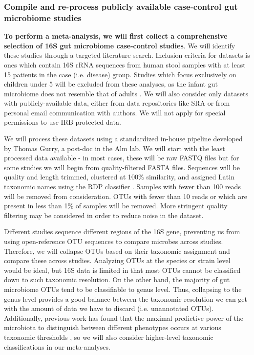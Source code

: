 \documentclass[12pt]{article}
\begin{document}
\subsubsection{Compile and re-process publicly available case-control gut microbiome studies}
\textbf{To perform a meta-analysis, we will first collect a 
comprehensive selection of 16S gut microbiome case-control studies}. We 
will identify these studies through a targeted literature search.  
Inclusion criteria for datasets is ones which contain 
16S rRNA sequences from human stool samples with at least 15 patients in the
case (i.e. disease) group. Studies which focus exclusively on 
children under 5 will be excluded from these analyses, as the infant
gut microbiome does not resemble that of adults \cite{lozupone-meta-2013}.
We will also consider only datasets with 
publicly-available data, either from data repositories like SRA or
from personal email communication with authors. We will not 
apply for special permissions to use IRB-protected data. 

We will process these datasets using a standardized in-house pipeline 
developed by Thomas Gurry, a post-doc in the Alm lab. We will 
start with the least processed data available - in most cases, these will be 
raw FASTQ files but for some studies we will begin from quality-filtered 
FASTA files. Sequences will be quality and length trimmed, clustered 
at 100\% similarity, and assigned Latin taxonomic names using the RDP 
classifier \cite{wang-rdp-2007}. Samples with fewer than 100 reads will be removed from 
consideration. OTUs with fewer than 10 reads or which are present in 
less than 1\% of samples will be removed. More stringent quality 
filtering may be considered in order to reduce noise in the dataset.

Different studies sequence different regions of the 16S gene,
preventing us from using open-reference OTU sequences to compare
microbes across studies. Therefore, we will collapse OTUs
based on their taxonomic assignment and compare these across studies.
Analyzing OTUs at the species or strain level would be ideal,
but 16S data is limited in that most OTUs cannot be classified
down to such taxonomic resolution. On the other hand, the majority of gut microbiome
OTUs tend to be classifiable to genus level. Thus, collapsing to the genus level 
provides a good balance between the taxonomic resolution we can get with the 
amount of data we have to discard (i.e. unannotated OTUs).
Additionally, previous work has found that the maximal predictive power of the microbiota
to distinguish between different phenotypes
occurs at various taxonomic thresholds \cite{knights-biomarkers-2011}, so we will
also consider higher-level taxonomic classifications in our meta-analyses.
\end{document}
